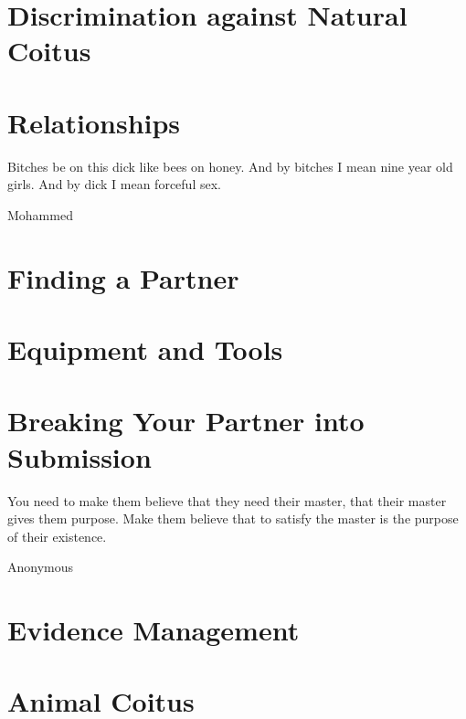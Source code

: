 

\chapter{Discrimination against Natural Coitus}



\chapter{Relationships}

\epigraph{Bitches be on this dick like bees on honey. And by bitches I mean 
nine 
year old girls. And by dick I mean forceful sex.}{Mohammed}



\chapter{Finding a Partner}



%


\chapter{Equipment and Tools}



\chapter{Breaking Your Partner into Submission}
\epigraph{You need to make them believe that they need their master, that their master 
gives them purpose. Make them believe that to satisfy the master is the purpose 
of their existence.}{Anonymous}


\chapter{Evidence Management}


\chapter{Animal Coitus}


